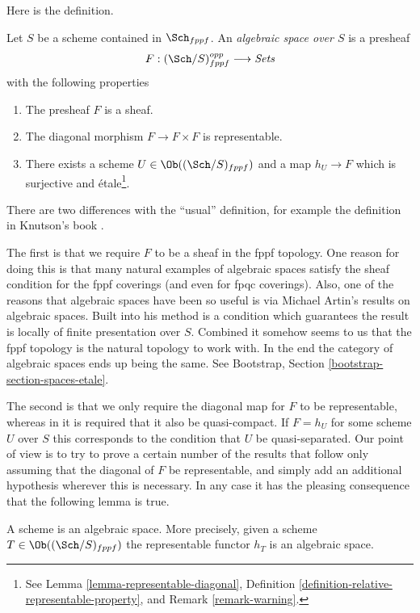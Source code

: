 \noindent
Here is the definition.

\begin{definition}
\label{definition-algebraic-space}
Let $S$ be a scheme contained in $\Sch_{fppf}$.
An {\it algebraic space over $S$} is a presheaf
$$
F : (\Sch/S)^{opp}_{fppf} \longrightarrow \textit{Sets}
$$
with the following properties
\begin{enumerate}
\item The presheaf $F$ is a sheaf.
\item The diagonal morphism $F  \to F \times F$ is representable.
\item There exists a scheme $U \in \Ob((\Sch/S)_{fppf})$
and a map $h_U \to F$ which is surjective and \'etale\footnote{See
Lemma \ref{lemma-representable-diagonal},
Definition \ref{definition-relative-representable-property}, and
Remark \ref{remark-warning}.}.
\end{enumerate}
\end{definition}

\noindent
There are two differences with the ``usual'' definition, for example the
definition in Knutson's book \cite{Kn}.

\medskip\noindent
The first is that we require $F$ to be a sheaf in the fppf topology.
One reason for doing this is that many natural examples
of algebraic spaces satisfy the sheaf condition for the fppf coverings
(and even for fpqc coverings). Also, one of the reasons that algebraic
spaces have been so useful is via Michael Artin's results on algebraic spaces.
Built into his method is a condition which guarantees the result is
locally of finite presentation over $S$.
Combined it somehow seems to us that the fppf topology
is the natural topology to work with. In the end the category
of algebraic spaces ends up being the same. See
Bootstrap, Section \ref{bootstrap-section-spaces-etale}.

\medskip\noindent
The second is that we only require the diagonal map for $F$ to be
representable, whereas in \cite{Kn} it is required that it also
be quasi-compact. If $F = h_U$ for some scheme $U$ over $S$
this corresponds to the condition that $U$ be quasi-separated.
Our point of view is to try to prove a certain
number of the results that follow only assuming that the diagonal
of $F$ be representable, and simply add an additional hypothesis wherever
this is necessary. In any case it has the pleasing consequence that
the following lemma is true.

\begin{lemma}
\label{lemma-scheme-is-space}
A scheme is an algebraic space. More precisely,
given a scheme $T \in \Ob((\Sch/S)_{fppf})$
the representable functor $h_T$ is an algebraic space.
\end{lemma}

